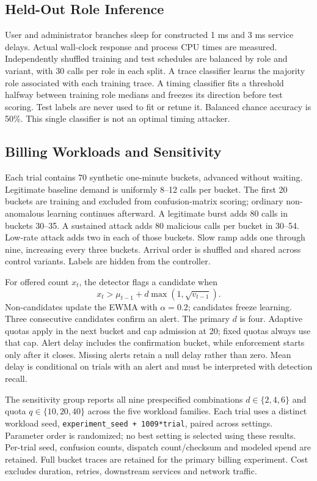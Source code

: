\documentclass[11pt,a4paper]{article}
\newcommand{\TrialCount}{30}
\begin{document}
\subsection{Held-Out Role Inference}
User and administrator branches sleep for constructed 1 ms and 3 ms service delays. Actual wall-clock response and process CPU times are measured. Independently shuffled training and test schedules are balanced by role and variant, with \TrialCount{} calls per role in each split. A trace classifier learns the majority role associated with each training trace. A timing classifier fits a threshold halfway between training role medians and freezes its direction before test scoring. Test labels are never used to fit or retune it. Balanced chance accuracy is 50\%. This single classifier is not an optimal timing attacker.

\subsection{Billing Workloads and Sensitivity}
Each trial contains 70 synthetic one-minute buckets, advanced without waiting. Legitimate baseline demand is uniformly 8--12 calls per bucket. The first 20 buckets are training and excluded from confusion-matrix scoring; ordinary non-anomalous learning continues afterward. A legitimate burst adds 80 calls in buckets 30--35. A sustained attack adds 80 malicious calls per bucket in 30--54. Low-rate attack adds two in each of those buckets. Slow ramp adds one through nine, increasing every three buckets. Arrival order is shuffled and shared across control variants. Labels are hidden from the controller.

For offered count $x_t$, the detector flags a candidate when
\[
x_t>\mu_{t-1}+d\max(1,\sqrt{v_{t-1}}).
\]
Non-candidates update the EWMA with $\alpha=0.2$; candidates freeze learning. Three consecutive candidates confirm an alert. The primary $d$ is four. Adaptive quotas apply in the next bucket and cap admission at 20; fixed quotas always use that cap. Alert delay includes the confirmation bucket, while enforcement starts only after it closes. Missing alerts retain a null delay rather than zero. Mean delay is conditional on trials with an alert and must be interpreted with detection recall.

The sensitivity group reports all nine prespecified combinations $d\in\{2,4,6\}$ and quota $q\in\{10,20,40\}$ across the five workload families. Each trial uses a distinct workload seed, \texttt{experiment\_seed + 1009*trial}, paired across settings. Parameter order is randomized; no best setting is selected using these results. Per-trial seed, confusion counts, dispatch count/checksum and modeled spend are retained. Full bucket traces are retained for the primary billing experiment. Cost excludes duration, retries, downstream services and network traffic.
\end{document}
